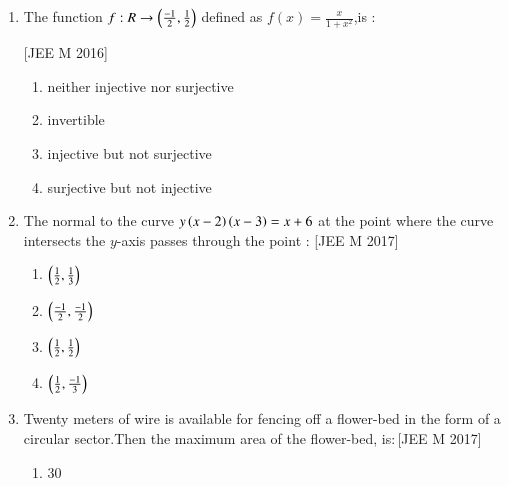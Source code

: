 \documentclass[journal,12pt,twocolumn]{IEEEtran}
\theoremstyle{remark}
\begin{document}
\begin{enumerate}
\hfill[JEE M 2016]\\
\begin{enumerate}
    \item  $x=2r$\\
    \item  $2x=r$\\
    \item  $2x=\brak{\pi+4r}$\\
    \item  $\brak{4-\pi}x=\pi r$\\
\end{enumerate}
\item The function $f : R\rightarrow {\ensuremath{\left(\frac{-1}{2},\frac{1}{2}\right)}}$ defined as $f(x)=\frac{x}{1+x^2}$,is :

\hfill[JEE M 2016]\\
\begin{enumerate}
    \item  neither injective nor surjective\\
    \item  invertible\\
    \item  injective but not surjective\\
    \item  surjective but not injective\\
\end{enumerate}
\item The normal to the curve $y\left(x-2\right)\left(x-3\right)=x+6$ at the point where the curve intersects the $y$-axis passes through the point : \hfill[JEE M 2017]
\begin{enumerate}
    \item  $\left(\frac{1}{2},\frac{1}{3}\right)$\\
    \item  $\left(\frac{-1}{2},\frac{-1}{2}\right)$\\
    \item  $\left(\frac{1}{2},\frac{1}{2}\right)$\\
    \item  $\left(\frac{1}{2},\frac{-1}{3}\right)$\\
\end{enumerate}
\item Twenty meters of wire is available for fencing off a flower-bed in the form of a circular sector.Then the maximum area of the flower-bed, is$:$\hfill[JEE M 2017]\\
\begin{enumerate}
    \item  30\\

\end{enumerate}
\end{enumerate}
\end{document}
